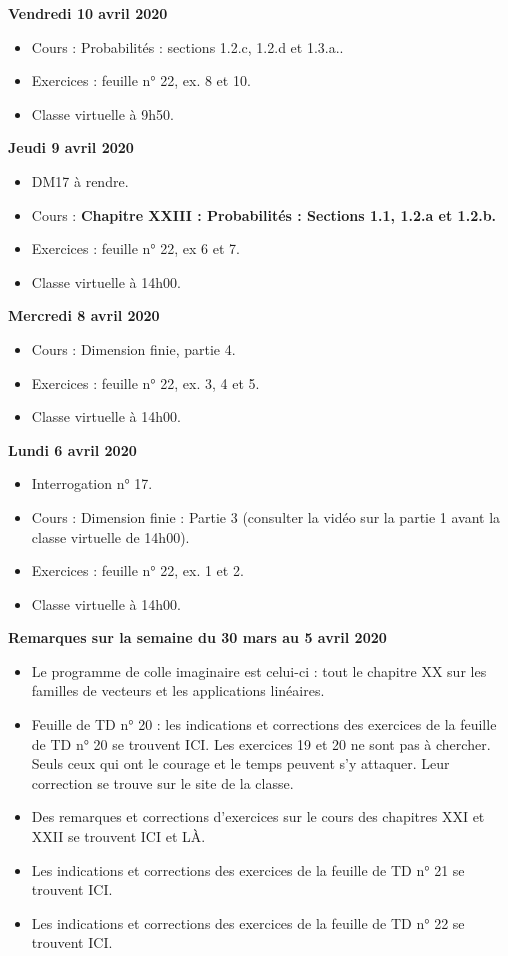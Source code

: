 \documentclass[12pt,a4paper]{article}
\begin{document}
\noindent\textbf{\bf Vendredi 10 avril 2020}
\begin{itemize}
\item Cours : Probabilités : sections 1.2.c, 1.2.d et 1.3.a..
\item Exercices : feuille n° 22, ex. 8 et 10.
\item Classe virtuelle à 9h50.\vspace{.4cm}
\end{itemize}

\noindent\textbf{Jeudi 9 avril 2020}
\begin{itemize}
\item DM17 à rendre.
\item Cours : \bf Chapitre XXIII \rm : Probabilités : Sections 1.1, 1.2.a et 1.2.b.
\item Exercices : feuille n° 22, ex 6 et 7.
\item Classe virtuelle à 14h00.\vspace{.4cm}
\end{itemize}

\noindent\textbf{Mercredi 8 avril 2020}
\begin{itemize}
\item Cours : Dimension finie, partie 4.
\item Exercices : feuille n° 22, ex. 3, 4 et 5.
\item Classe virtuelle à 14h00.\vspace{.4cm}
\end{itemize}

\noindent\textbf{\bf Lundi 6 avril 2020}
\begin{itemize}
\item Interrogation n° 17.
\item Cours : Dimension finie : Partie 3 (consulter la vidéo sur la partie 1 avant la classe virtuelle de 14h00).
\item Exercices : feuille n° 22, ex. 1 et 2.
\item Classe virtuelle à 14h00.\vspace{.4cm}
\end{itemize}


\noindent\textbf{\bf Remarques sur la semaine du 30 mars au 5 avril 2020}
\begin{itemize}
\item Le programme de colle imaginaire est celui-ci : tout le chapitre XX sur les familles de vecteurs et les applications linéaires.
\item Feuille de TD n° 20 : les indications et corrections des exercices de la feuille de TD n° 20 se trouvent ICI. Les exercices 19 et 20 ne sont pas à chercher. Seuls ceux qui ont le courage et le temps peuvent s'y attaquer. Leur correction se trouve sur le site de la classe.
\item Des remarques et corrections d'exercices sur le cours des chapitres XXI et XXII se trouvent ICI et LÀ.
\item Les indications et corrections des exercices de la feuille de TD n° 21 se trouvent ICI.
\item Les indications et corrections des exercices de la feuille de TD n° 22 se trouvent ICI.\vspace{.4cm}
\end{itemize}
\end{document}
